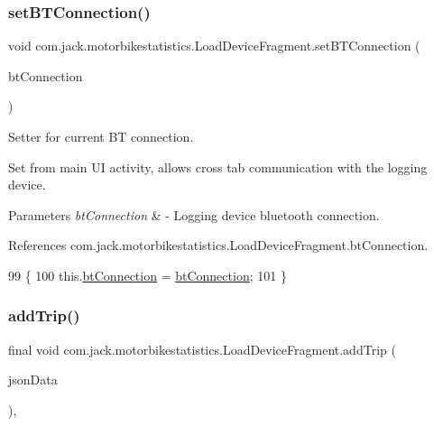 \subsubsection{\texorpdfstring{set\+B\+T\+Connection()}{setBTConnection()}}
{\footnotesize\ttfamily void com.\+jack.\+motorbikestatistics.\+Load\+Device\+Fragment.\+set\+B\+T\+Connection (\begin{DoxyParamCaption}\item[{\hyperlink{classcom_1_1jack_1_1motorbikestatistics_1_1_b_t_connection}{B\+T\+Connection}}]{bt\+Connection }\end{DoxyParamCaption})\hspace{0.3cm}{\ttfamily [inline]}}



Setter for current BT connection. 

Set from main UI activity, allows cross tab communication with the logging device.


\begin{DoxyParams}{Parameters}
{\em bt\+Connection} & -\/ Logging device bluetooth connection. \\
\hline
\end{DoxyParams}


References com.\+jack.\+motorbikestatistics.\+Load\+Device\+Fragment.\+bt\+Connection.


\begin{DoxyCode}
99                                                            \{
100         this.\hyperlink{classcom_1_1jack_1_1motorbikestatistics_1_1_load_device_fragment_a7a446c4528638e9d169481c3ff1471b0}{btConnection} = \hyperlink{classcom_1_1jack_1_1motorbikestatistics_1_1_load_device_fragment_a7a446c4528638e9d169481c3ff1471b0}{btConnection};
101     \}
\end{DoxyCode}
\mbox{\label{classcom_1_1jack_1_1motorbikestatistics_1_1_load_device_fragment_a23957dbe1518052c7167d86938a14c35}} 
\subsubsection{\texorpdfstring{add\+Trip()}{addTrip()}}
{\footnotesize\ttfamily final void com.\+jack.\+motorbikestatistics.\+Load\+Device\+Fragment.\+add\+Trip (\begin{DoxyParamCaption}\item[{J\+S\+O\+N\+Object}]{json\+Data }\end{DoxyParamCaption})\hspace{0.3cm}{\ttfamily [inline]}, {\ttfamily [private]}}



